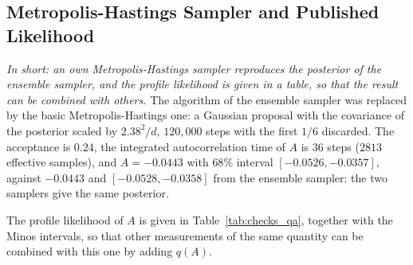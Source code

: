 \subsection{Metropolis-Hastings Sampler and Published Likelihood}
\label{sec:checks_mh}
\emph{In short: an own Metropolis-Hastings sampler reproduces the posterior of the ensemble sampler, and the profile likelihood is given in a table, so that the result can be combined with others.}
The algorithm of the ensemble sampler was replaced by the basic Metropolis-Hastings one: a Gaussian proposal with the covariance of the posterior scaled by $2.38^2/d$, $120{,}000$ steps with the first $1/6$ discarded. The acceptance is $0.24$, the integrated autocorrelation time of $A$ is $36$ steps ($2813$ effective samples), and $A=-0.0443$ with $68\%$ interval $[-0.0526,-0.0357]$, against $-0.0443$ and $[-0.0528,-0.0358]$ from the ensemble sampler: the two samplers give the same posterior.

The profile likelihood of $A$ is given in Table~\ref{tab:checks_qa}, together with the Minos intervals, so that other measurements of the same quantity can be combined with this one by adding $q(A)$.

\begin{table}[h]
\centering
{}
\caption{Profile likelihood ratio $q(A)=-2\Delta\ln L$ of the nominal fit (other parameters profiled); minimum at $-0.0441$, Minos intervals $[-0.0526,-0.0356]$ ($68\%$) and $[-0.0607,-0.0275]$ ($95\%$).}
\label{tab:checks_qa}
\end{table}
